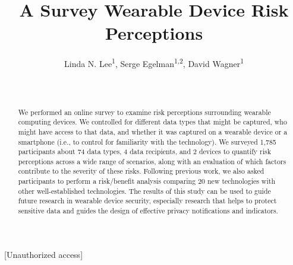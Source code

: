 \documentclass{acm_proc_article-sp}
\begin{document}
\title{A Survey Wearable Device Risk Perceptions}



\author{
 \alignauthor Linda N. Lee\textsuperscript{1}, Serge Egelman\textsuperscript{1,2}, David Wagner\textsuperscript{1}\\
   \vspace{0.5em}
   \\
   \\
}

\maketitle



\begin{abstract}
We performed an online survey to examine risk perceptions surrounding wearable computing devices. We controlled for different data types that might be captured, who might have access to that data, and whether it was captured on a wearable device or a smartphone (i.e., to control for familiarity with the technology). We surveyed 1,785 participants about 74 data types, 4 data recipients, and 2 devices to quantify risk perceptions across a wide range of scenarios, along with an evaluation of which factors contribute to the severity of these risks. Following previous work, we also asked participants to perform a risk/benefit analysis comparing 20 new technologies with other well-established technologies. The results of this study can be used to guide future research in wearable device security, especially research that helps to protect sensitive data and guides the design of effective privacy notifications and indicators.
\end{abstract}

[Unauthorized access]

\end{document}
